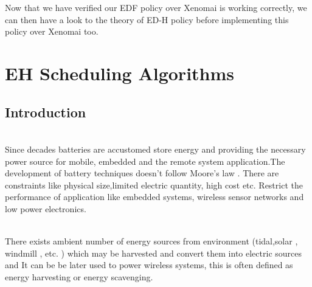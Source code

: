 \documentclass[12pt,hidelinks]{article}
\begin{document}
{    Now that we have verified our EDF policy over Xenomai is working correctly, we can then have a look to the theory of ED-H policy before implementing this policy over Xenomai too.

\newpage	

\section{EH Scheduling Algorithms}
\vspace{4cm}

\subsection{Introduction}
\\Since decades batteries are accustomed store energy and providing the necessary power source for mobile, embedded and the remote system application.The development of battery techniques doesn't follow Moore's law . There are constraints like physical size,limited electric quantity, high cost etc. Restrict the performance of application like embedded systems, wireless sensor networks and low power electronics.\newline

\\There exists ambient number of energy sources from environment (tidal,solar , windmill , etc. ) which may be harvested and convert them into electric sources and It can be be later used to power wireless systems, this is often defined as energy harvesting or energy scavenging\cite{mipi-csi}.\newline

}
\end{document}

